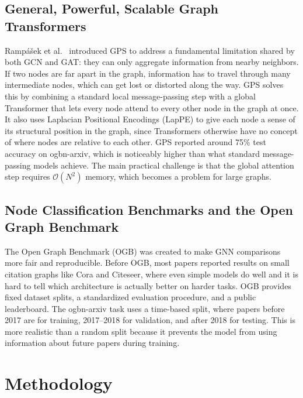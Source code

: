 \documentclass[conference]{IEEEtran}
\begin{document}
\subsection{General, Powerful, Scalable Graph Transformers}

Ramp\'{a}\v{s}ek et al.~\cite{rampasek2022} introduced GPS to address a fundamental
limitation shared by both GCN and GAT: they can only aggregate information from nearby
neighbors. If two nodes are far apart in the graph, information has to travel through many
intermediate nodes, which can get lost or distorted along the way. GPS solves this by
combining a standard local message-passing step with a global Transformer that lets every
node attend to every other node in the graph at once. It also uses Laplacian Positional
Encodings (LapPE) to give each node a sense of its structural position in the graph,
since Transformers otherwise have no concept of where nodes are relative to each other.
GPS reported around 75\% test accuracy on ogbn-arxiv, which is noticeably higher than
what standard message-passing models achieve. The main practical challenge is that the
global attention step requires $\mathcal{O}(N^2)$ memory, which becomes a problem for
large graphs.

\subsection{Node Classification Benchmarks and the Open Graph Benchmark}

The Open Graph Benchmark (OGB) was created to make GNN comparisons more fair and
reproducible. Before OGB, most papers reported results on small citation graphs like Cora
and Citeseer, where even simple models do well and it is hard to tell which architecture
is actually better on harder tasks. OGB provides fixed dataset splits, a standardized
evaluation procedure, and a public leaderboard. The ogbn-arxiv task uses a time-based
split, where papers before 2017 are for training, 2017--2018 for validation, and after
2018 for testing. This is more realistic than a random split because it prevents the model
from using information about future papers during training.

\section{Methodology}
\end{document}
